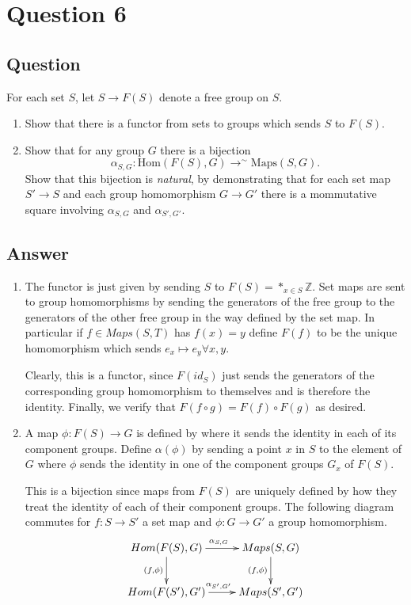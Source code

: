 \documentclass[11pt]{article}
\begin{document}
\section{Question 6}
\subsection{Question}
For each set $S$, let $S \to F(S)$ denote a free group on $S$. 
\begin{enumerate}
\item Show that there is a functor from sets to groups which sends $S$ to $F(S)$. 
\item Show that for any group $G$ there is a bijection
\[\alpha_{S,G}: \mathrm{Hom}(F(S),G) \to^{\sim} \mathrm{Maps}(S,G).\]
Show that this bijection is \emph{natural}, by demonstrating that for each set map $S' \to S$ and each group homomorphism $G \to G'$ there is a mommutative square involving $\alpha_{S,G}$ and $\alpha_{S',G'}$.
\end{enumerate}
\subsection{Answer}
\begin{enumerate}
\item The functor is just given by sending $S$ to $F(S) = *_{x \in S} \mathbb{Z}$. Set maps are sent to group homomorphisms by sending the generators of the free group to the generators of the other free group in the way defined by the set map. In particular if $f \in Maps(S,T)$ has $f(x)=y$ define $F(f)$ to be the unique homomorphism which sends $e_x \mapsto e_y \forall x,y$.

Clearly, this is a functor, since $F(id_S)$ just sends the generators of the corresponding group homomorphism to themselves and is therefore the identity. Finally, we verify that $F(f \circ g) = F(f) \circ F(g)$ as desired.  
\item A map $\phi: F(S) \to G$ is defined by where it sends the identity in each of its component groups. Define $\alpha(\phi)$ by sending a point $x$ in $S$ to the element of $G$ where $\phi$ sends the identity in one of the component groups $G_x$ of $F(S)$.

This is a bijection since maps from $F(S)$ are uniquely defined by how they treat the identity of each of their component groups. The following diagram commutes for $f:S \to S'$ a set map and $\phi: G \to G'$ a group homomorphism.
\[\xymatrix{
Hom(F(S),G) \ar[d]_{(f,\phi)} \ar[r]^{\alpha_{S,G}} & Maps(S,G)  \ar[d]_{(f,\phi)} \\
Hom(F(S'),G') \ar[r]^{\alpha_{S',G'}}& Maps(S',G')}\]


\end{enumerate}
\end{document}
